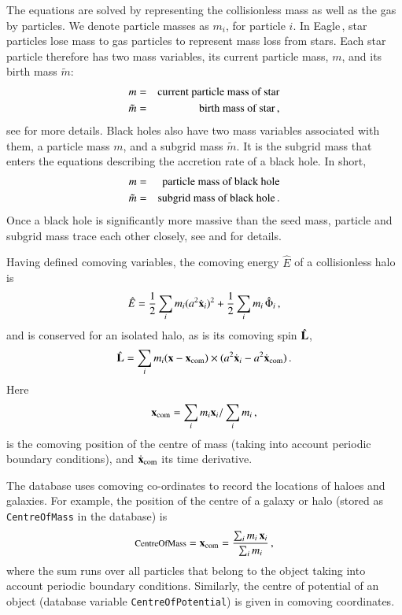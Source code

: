 The equations are solved by representing the collisionless mass as well as the gas by particles. We denote particle masses as $m_i$, for particle $i$. In {\sc Eagle}\,, star particles lose mass to gas particles to represent mass loss from stars. Each star particle therefore has two mass variables, its current particle mass, $m$, and its birth mass $\tilde m$:
\begin{eqnarray}
m &=& \hbox{current particle mass of star}\nonumber\\
\tilde m&=&\hbox{birth mass of star}\,,
\label{eq:m_star}
\end{eqnarray}
see \cite{Wiersma2009b} for more details. Black holes also have two mass variables associated with them, a particle mass $m$, and a subgrid mass $\tilde m$. It is the subgrid mass that enters the equations describing the accretion rate of a black hole. In short,
\begin{eqnarray}
m &=& \hbox{particle mass of black hole}\nonumber\\
\tilde m&=&\hbox{subgrid mass of black hole}\,.
\label{eq:m_bh}
\end{eqnarray}
Once a black hole is significantly more massive than the seed mass, particle and subgrid mass trace each other closely, see \cite{Booth_Schaye2009} and \cite{Guevara2013} for details.

Having defined comoving variables, the comoving energy $\hat E$ of a collisionless halo is
\begin{equation}
\hat E = {1\over 2}\sum_i m_i (a^2\dot{\bf x}_i)^2 + {1\over 2} \sum_i {m_i\,\hat\Phi_i}\,,
\end{equation}
and is conserved for an isolated halo, as is its comoving spin $\hat{\bf L}$,
\begin{equation}
\hat{\bf L} = \sum_i m_i({\bf x}-{\bf x}_{\rm com})\times(a^2\dot{\bf x}_i-a^2{\dot{\bf x}}_{\rm com})\,.
\label{eq:spin}
\end{equation}
Here 
\begin{equation}
{\bf x}_{\rm com}=\sum_i m_i{\bf x}_i/\sum_i m_i\,,
\label{eq:com}
\end{equation}
is the comoving position of the centre of mass (taking into account periodic boundary conditions), and $\dot{\bf x}_{\rm com}$ its time derivative.

The database uses comoving co-ordinates to record the locations of haloes and galaxies.
For example, the position of the centre of a galaxy or halo (stored as {\tt CentreOfMass} in the database) is 
\begin{equation}
\hbox{\footnotesize CentreOfMass} = {\bf x}_{\rm com} = {\sum_i m_i\,{\bf x}_i\over \sum_i m_i}\,,
\label{eq:CentreOfMass}
\end{equation}
where the sum runs over all particles that belong to the object taking into account periodic boundary conditions. Similarly, the centre of potential of an object (database variable {\tt CentreOfPotential}) is given in comoving coordinates.

